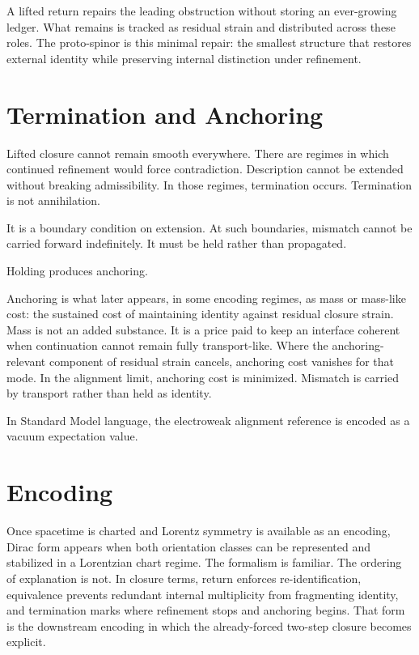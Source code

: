 \documentclass[11pt,twoside,openright]{book}
\begin{document}
A lifted return repairs the leading obstruction without storing an ever-growing ledger. What remains is tracked as residual strain and distributed across these roles. The proto-spinor is this minimal repair: the smallest structure that restores external identity while preserving internal distinction under refinement.

\section*{Termination and Anchoring}

Lifted closure cannot remain smooth everywhere. There are regimes in which continued refinement would force contradiction. Description cannot be extended without breaking admissibility. In those regimes, termination occurs. Termination is not annihilation.

It is a boundary condition on extension. At such boundaries, mismatch cannot be carried forward indefinitely. It must be held rather than propagated.

Holding produces anchoring.

Anchoring is what later appears, in some encoding regimes, as mass or mass-like cost: the sustained cost of maintaining identity against residual closure strain. Mass is not an added substance. It is a price paid to keep an interface coherent when continuation cannot remain fully transport-like. Where the anchoring-relevant component of residual strain cancels, anchoring cost vanishes for that mode. In the alignment limit, anchoring cost is minimized. Mismatch is carried by transport rather than held as identity.

In Standard Model language, the electroweak alignment reference is encoded as a vacuum expectation value.

\section*{Encoding}

Once spacetime is charted and Lorentz symmetry is available as an encoding, Dirac form appears when both orientation classes can be represented and stabilized in a Lorentzian chart regime. The formalism is familiar. The ordering of explanation is not. In closure terms, return enforces re-identification, equivalence prevents redundant internal multiplicity from fragmenting identity, and termination marks where refinement stops and anchoring begins. That form is the downstream encoding in which the already-forced two-step closure becomes explicit.
\end{document}
